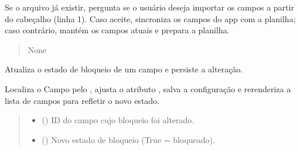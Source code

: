 \documentclass[letterpaper,10pt,english]{sphinxmanual}
\begin{document}
\begin{fulllineitems}
\begin{fulllineitems}
\sphinxAtStartPar
Se o arquivo já existir, pergunta se o usuário deseja importar os campos a
partir do cabeçalho (linha 1). Caso aceite, sincroniza os campos do app com
a planilha; caso contrário, mantém os campos atuais e prepara a planilha.
\begin{quote}\begin{description}
\sphinxAtStartPar
{}

\sphinxAtStartPar
None

\end{description}\end{quote}

\end{fulllineitems}


\begin{fulllineitems}
\label{\detokenize{api/app:app.App.on_field_lock_toggled}}
\pysigstartsignatures
\pysiglinewithargsret
{}
{\sphinxparamcomma {}}
{}
\pysigstopsignatures
\sphinxAtStartPar
Atualiza o estado de bloqueio de um campo e persiste a alteração.

\sphinxAtStartPar
Localiza o Campo pelo , ajusta o atributo , salva a
configuração e re\sphinxhyphen{}renderiza a lista de campos para refletir o novo estado.
\begin{quote}\begin{description}
\begin{itemize}
\item {} 
\sphinxAtStartPar
{} () \textendash{} ID do campo cujo bloqueio foi alterado.

\item {} 
\sphinxAtStartPar
{} () \textendash{} Novo estado de bloqueio (True = bloqueado).

\end{itemize}

\sphinxAtStartPar
{}


\end{description}
\end{quote}
\end{fulllineitems}
\end{fulllineitems}
\end{document}
